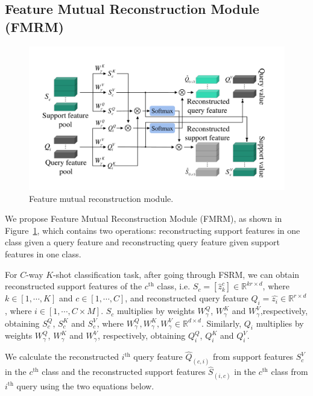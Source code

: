 \documentclass[letterpaper]{article} %
\begin{document}
\subsection{Feature Mutual Reconstruction Module (FMRM)}
\begin{figure}[ht]
  \centering
  \includegraphics[width=0.8\linewidth]{figures/3.3.pdf}
  \caption{Feature mutual reconstruction module.}
  \label{fig:3.3}
\end{figure}







We propose Feature Mutual Reconstruction Module (FMRM), as shown in Figure~\ref{fig:3.3}, which contains two operations: 
reconstructing support features in one class given a query feature and reconstructing query feature given support features in one class.



For $C$-way $K$-shot classification task, after going through FSRM, we can obtain reconstructed support features of the $c^\text{th}$ class, i.e. $S_c = [\hat{z}_k^c] \in \mathbb{R}^{kr\times d} $, where $k \in [1,\cdots, K]$ {and $c \in [1,\cdots, C]$}, and reconstructed query feature $Q_i =\hat{z_i} \in \mathbb{R}^{r\times d}$, where 
$i \in [1,\cdots, C\times M]$. 
$S_c$ multiplies by weights $W_{\gamma}^Q$, $W_{\gamma}^K$ and $W_{\gamma}^V$,respectively, obtaining $S_c^Q$, $S_c^K$ and $S_c^V$, where $W_{\gamma}^Q, W_{\gamma}^K, W_{\gamma}^V \in \mathbb{R}^{d\times d}$. Similarly, $Q_i$ multiplies by weights $W_{\gamma}^Q$, $W_{\gamma}^K$ and $W_{\gamma}^V$, respectively, obtaining $Q_i^Q$, $Q_i^K$ and $Q_i^V$.








We calculate the reconstructed $i^\text{th}$ query feature $\hat{Q}_{(c,i)}$ from {support features $S_c^V$ in the $c^\text{th}$ class and the reconstructed support features $\hat{S}_{(i,c)}$ in the $c^\text{th}$ class} from $i^\text{th}$ query using the two equations below.
\end{document}
